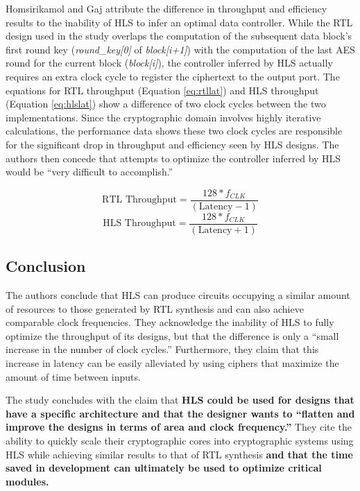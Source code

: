 \documentclass[12pt,journal,compsoc,onecolumn]{IEEEtran}
\begin{document}
Homsirikamol and Gaj attribute the difference in throughput and efficiency results to the inability of HLS to infer an optimal data controller. While the RTL design used in the study overlaps the computation of the subsequent data block's first round key (\emph{round\_key[0]} of \emph{block[i+1]}) with the computation of the last AES round for the current block (\emph{block[i]}), the controller inferred by HLS actually requires an extra clock cycle to register the ciphertext to the output port. The equations for RTL throughput (Equation \ref{eq:rtllat}) and HLS throughput (Equation \ref{eq:hlslat}) show a difference of two clock cycles between the two implementations. Since the cryptographic domain involves highly iterative calculations, the performance data shows these two clock cycles are responsible for the significant drop in throughput and efficiency seen by HLS designs. The authors then concede that attempts to optimize the controller inferred by HLS would be ``very difficult to accomplish.''

\begin{equation}\label{eq:rtllat}
	\text{RTL Throughput}=\frac{128*f_{CLK}}{(\text{Latency}-1)}
\end{equation}
\begin{equation}\label{eq:hlslat}
	\text{HLS Throughput}=\frac{128*f_{CLK}}{(\text{Latency}+1)}
\end{equation}

\subsection{Conclusion}

The authors conclude that HLS can produce circuits occupying a similar amount of resources to those generated by RTL synthesis and can also achieve comparable clock frequencies. They acknowledge the inability of HLS to fully optimize the throughput of its designs, but that the difference is only a ``small increase in the number of clock cycles.'' Furthermore, they claim that this increase in latency can be easily alleviated by using ciphers that maximize the amount of time between inputs.

The study concludes with the claim that \textbf{HLS could be used for designs that have a specific architecture and that the designer wants to ``flatten and improve the designs in terms of area and clock frequency.''} They cite the ability to quickly scale their cryptographic cores into cryptographic systems using HLS while achieving similar results to that of RTL synthesis \textbf{and that the time saved in development can ultimately be used to optimize critical modules.}
\end{document}
